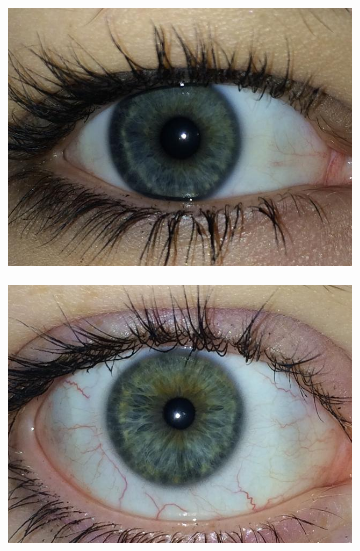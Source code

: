\begin{figure}[H]
\medskip
\begin{subfigure}{0.25\textwidth}
  \includegraphics[width=\linewidth]{img/Resultados/warsaw/right_22.jpg}
  \caption{}
\end{subfigure}\hfil %
\begin{subfigure}{0.25\textwidth}
  \includegraphics[width=\linewidth]{img/Resultados/warsaw/right_32.jpg}
  \caption{}
\end{subfigure}\hfil %
\begin{subfigure}{0.25\textwidth}

\end{subfigure}
\end{figure}
